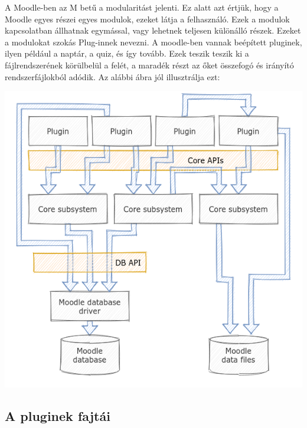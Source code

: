 A Moodle-ben az M betű a modularitást jelenti. Ez alatt azt értjük, hogy a Moodle egyes részei egyes modulok, ezeket látja a felhasználó. Ezek a modulok kapcsolatban állhatnak egymással, vagy lehetnek teljesen különálló részek. Ezeket a modulokat szokás Plug-innek nevezni. A moodle-ben vannak beépített pluginek, ilyen például a naptár, a quiz, és így tovább. Ezek teszik teszik ki a fájlrendszerének körülbelül a felét, a maradék részt az őket összefogó és irányító rendszerfájlokból adódik. Az alábbi ábra jól illusztrálja ezt:

\begin{center}
    \includegraphics[scale=0.7]{Fejezetek/Images/moodleBuild.png}
\end{center}

\subsection{A pluginek fajtái}

